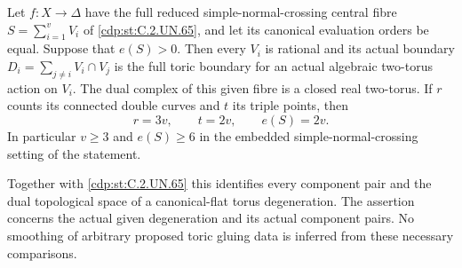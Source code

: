 
\begin{proposition}\label{cdp:st:C.2.UN.68}
Let $f:X\to\Delta$ have the full reduced simple-normal-crossing
central fibre $S=\sum_{i=1}^{v}V_i$ of \ref{cdp:st:C.2.UN.65}, and let its
canonical evaluation orders be equal. Suppose that $e(S)>0$.
Then every $V_i$ is rational and its actual boundary
$D_i=\sum_{j\ne i}V_i\cap V_j$ is the full toric boundary
for an actual algebraic two-torus action on $V_i$.
The dual complex of this given fibre is a closed real
two-torus. If $r$ counts its connected double curves and
$t$ its triple points, then
\[
                  r=3v,\qquad t=2v,\qquad e(S)=2v.
\tag{C.TC.1}\label{cdp:eq:C.TC.1}
\]
In particular $v\ge3$ and $e(S)\ge6$ in the embedded
simple-normal-crossing setting of the statement.

Together with \ref{cdp:st:C.2.UN.65} this identifies every component
pair and the dual topological space of a canonical-flat
torus degeneration. The assertion concerns the actual
given degeneration and its actual component pairs.
No smoothing of arbitrary proposed toric gluing data
is inferred from these necessary comparisons.
\end{proposition}

